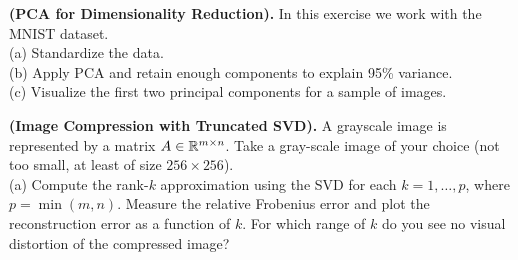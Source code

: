 \begin{myexercise}
\textbf{(PCA for Dimensionality Reduction).} In this exercise we work with the MNIST dataset.\\
(a) Standardize the data.\\
(b) Apply PCA and retain enough components to explain 95\% variance.\\
(c) Visualize the first two principal components for a sample of images.
\end{myexercise}

\begin{myexercise}\textbf{(Image Compression with Truncated SVD).} A grayscale image is represented by a matrix $A \in \mathbb{R}^{m \times n}$. Take a gray-scale image of your choice (not too small, at least of size $256\times 256$). \\
(a) Compute the rank-$k$ approximation using the SVD
for each $k=1,\dots,p$, where $p =\min(m,n)$.
Measure the relative Frobenius error and plot the reconstruction error as a function of $k$. For which range of $k$ do you see no visual distortion of the compressed image?
\end{myexercise}    
